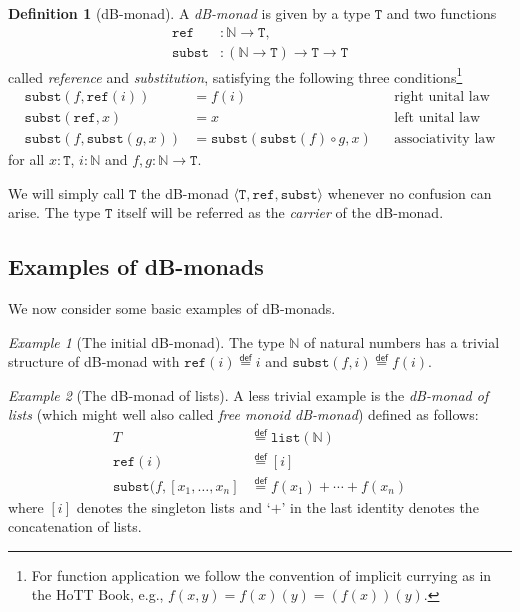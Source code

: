 \documentclass[a4paper,twoside,12pt]{article}
\theoremstyle{definition}
\newtheorem{definition}{Definition}
\theoremstyle{remark}
\theoremstyle{example}
\newtheorem{example}{Example}
\newcommand{\NN}{\mathbb{N}}
\newcommand{\TT}{\mathtt{T}}
\newcommand{\subst}{\mathtt{subst}}
\newcommand{\refe}{\mathtt{ref}}
\begin{document}
\begin{definition}[dB-monad]
  A \emph{dB-monad} is given by a type $\TT$ and two functions
  \begin{align*}
    \refe &\colon \NN \to \TT, \\
    \subst &\colon (\NN \to \TT) \to \TT \to \TT
  \end{align*}
  called \emph{reference} and \emph{substitution}, satisfying the
  following three conditions\footnote{For function application we
    follow the convention of implicit currying as in the HoTT Book,
    e.g., $f(x,y) = f(x)(y) = (f(x))(y)$.}
  \begin{align*}
    \subst(f,\refe(i)) &=  f(i)
    && \text{right unital law} \\
    \subst(\refe, x) &=  x
    && \text{left unital law} \\
    \subst(f, \subst(g, x)) &= \subst(\subst(f) \circ g, x)
    &&\text{associativity law}
  \end{align*}
  for all $x : \TT$, $i :\NN$ and $f,g\colon \NN \to \TT$.
\end{definition}

We will simply call $\TT$ the dB-monad
$\langle \TT, \refe, \subst \rangle$ whenever no confusion can arise.
The type $\TT$ itself will be referred as the \emph{carrier} of the
dB-monad.

\subsection{Examples of dB-monads}
\label{sec:examples-dB-monads}

We now consider some basic examples of dB-monads.

\begin{example}[The initial dB-monad]
  The type $\NN$ of natural numbers has a trivial structure of
  dB-monad with $\refe(i) \stackrel{\mathsf{def}}{=} i$ and
  $\subst(f,i) \stackrel{\mathsf{def}}{=} f(i)$.
\end{example}

\begin{example}[The dB-monad of lists]
  A less trivial example is the \emph{dB-monad of lists} (which might
  well also called \emph{free monoid dB-monad}) defined as follows:
  \begin{align*}
    T &\stackrel{\mathsf{def}}{=}\mathtt{list}(\NN) \\
    \refe(i) &\stackrel{\mathsf{def}}{=} [i] \\
    \subst(f,[x_1, \dots, x_n] &\stackrel{\mathsf{def}}{=} f(x_1) + \cdots + f(x_n)
  \end{align*}
  where $[i]$ denotes the singleton lists and `$+$' in the last
  identity denotes the concatenation of lists.
\end{example}
\end{document}
